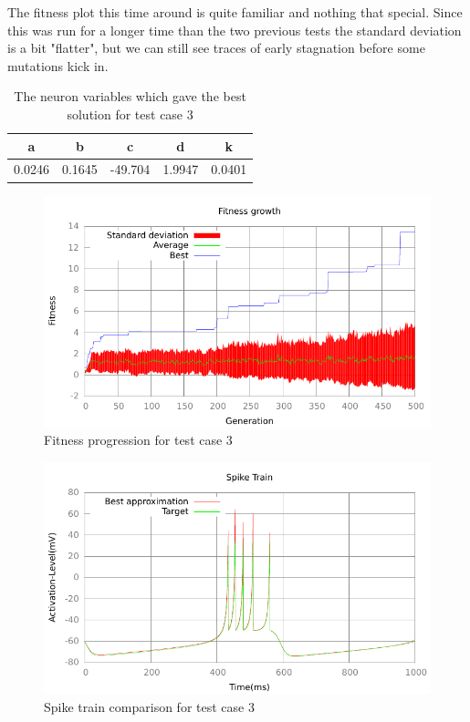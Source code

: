 The fitness plot this time around is quite familiar and nothing that special.
Since this was run for a longer time than the two previous tests the standard
deviation is a bit "flatter", but we can still see traces of early stagnation
before some mutations kick in.
\begin{table}
	\begin{tabular}{c c c c c}
		a & b & c & d & k \\
		\hline
		0.0246 & 0.1645 & -49.704 & 1.9947 & 0.0401
	\end{tabular}
	\caption{The neuron variables which gave the best solution for test case
	3}
\end{table}
\begin{figure}[h]
	\centering
	\includegraphics{../output/wdm_izzy_1_fitness.pdf}
	\caption{Fitness progression for test case 3}
	\label{fig:fitness-test-case-3}
\end{figure}
\begin{figure}[h]
	\centering
	\includegraphics{../output/wdm_izzy_1_spike.pdf}
	\caption{Spike train comparison for test case 3}
	\label{fig:spike-test-case-3}
\end{figure}

